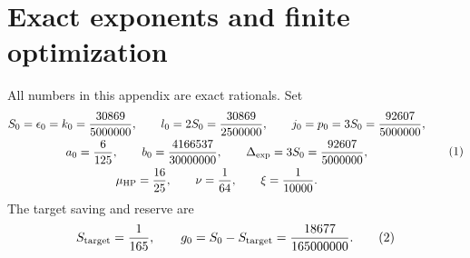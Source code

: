 \section{Exact exponents and finite optimization}
\label{app:arithmetic}

All numbers in this appendix are exact rationals. Set
\[
\begin{gathered}
S_0=\epsilon_0=k_0=\frac{30869}{5000000},\qquad
l_0=2S_0=\frac{30869}{2500000},\qquad
j_0=p_0=3S_0=\frac{92607}{5000000},\\
a_0=\frac6{125},\qquad b_0=\frac{4166537}{30000000},\qquad
\Delta_{\rm exp}=3S_0=\frac{92607}{5000000},\\
\mu_{\rm HP}=\frac{16}{25},\qquad \nu=\frac1{64},\qquad
\xi=\frac1{10000}.
\end{gathered}
\AutoTag{eq:old:D_1}
\]
The target saving and reserve are
\[
S_{\rm target}=\frac1{165},\qquad
g_0=S_0-S_{\rm target}=\frac{18677}{165000000}.
\AutoTag{eq:old:D_2}
\]

